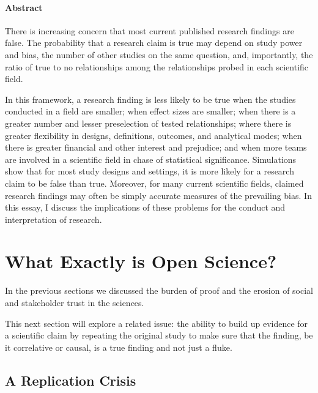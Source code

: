 \documentclass[
]{book}
\begin{document}
\hypertarget{abstract-1}{%
\paragraph*{Abstract}\label{abstract-1}}

There is increasing concern that most current published research findings are false. The probability that a research claim is true may depend on study power and bias, the number of other studies on the same question, and, importantly, the ratio of true to no relationships among the relationships probed in each scientific field.

In this framework, a research finding is less likely to be true when the studies conducted in a field are smaller; when effect sizes are smaller; when there is a greater number and lesser preselection of tested relationships; where there is greater flexibility in designs, definitions, outcomes, and analytical modes; when there is greater financial and other interest and prejudice; and when more teams are involved in a scientific field in chase of statistical significance. Simulations show that for most study designs and settings, it is more likely for a research claim to be false than true. Moreover, for many current scientific fields, claimed research findings may often be simply accurate measures of the prevailing bias. In this essay, I discuss the implications of these problems for the conduct and interpretation of research.

\hypertarget{what-exactly-is-open-science}{%
\section{What Exactly is Open Science?}\label{what-exactly-is-open-science}}

In the previous sections we discussed the burden of proof and the erosion of social and stakeholder trust in the sciences.

This next section will explore a related issue: the ability to build up evidence for a scientific claim by repeating the original study to make sure that the finding, be it correlative or causal, is a true finding and not just a fluke.

\hypertarget{a-replication-crisis}{%
\subsection*{A Replication Crisis}\label{a-replication-crisis}}
\end{document}
